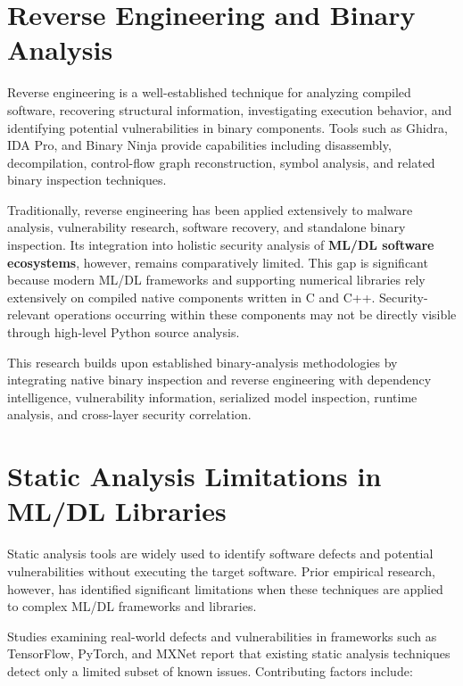 \documentclass[
  12pt,
  letterpaper,
  oneside]{report}
\begin{document}
\section{Reverse Engineering and Binary Analysis}\label{81-reverse-engineering-and-binary-analysis}

Reverse engineering is a well-established technique for analyzing
compiled software, recovering structural information, investigating
execution behavior, and identifying potential vulnerabilities in binary
components. Tools such as Ghidra, IDA Pro, and Binary Ninja provide
capabilities including disassembly, decompilation, control-flow graph
reconstruction, symbol analysis, and related binary inspection
techniques.

Traditionally, reverse engineering has been applied extensively to
malware analysis, vulnerability research, software recovery, and
standalone binary inspection. Its integration into holistic security
analysis of \textbf{ML/DL software ecosystems}, however, remains
comparatively limited. This gap is significant because modern ML/DL
frameworks and supporting numerical libraries rely extensively on
compiled native components written in C and C++. Security-relevant
operations occurring within these components may not be directly visible
through high-level Python source analysis.
\cite{ning2024binarysca,wang2024binarysca}

This research builds upon established binary-analysis methodologies by
integrating native binary inspection and reverse engineering with
dependency intelligence, vulnerability information, serialized model
inspection, runtime analysis, and cross-layer security correlation.

\section{Static Analysis Limitations in ML/DL Libraries}\label{82-static-analysis-limitations-in-mldl-libraries}

Static analysis tools are widely used to identify software defects and
potential vulnerabilities without executing the target software. Prior
empirical research, however, has identified significant limitations when
these techniques are applied to complex ML/DL frameworks and libraries.

Studies examining real-world defects and vulnerabilities in frameworks
such as TensorFlow, PyTorch, and MXNet report that existing static
analysis techniques detect only a limited subset of known issues.
\cite{harzevili2023static,filus2023software}
Contributing factors include:
\end{document}
